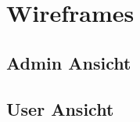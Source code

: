 \Author{\daAuthorTwo} %

\section{Wireframes}

\subsection{Admin Ansicht}

\subsection{User Ansicht}


